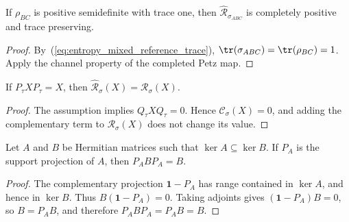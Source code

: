 \begin{theorem}
    \label{thm:entropy_completed_petz_maximally_mixed_cptp}
    \leanok
    If $\rho_{BC}$ is positive semidefinite with trace one, then
    $\widehat{\mathcal R}_{\sigma_{ABC}}$ is completely positive and trace
    preserving.
\end{theorem}

\begin{proof}\leanok
    By~(\ref{eq:entropy_mixed_reference_trace}),
    $\tr(\sigma_{ABC})=\tr(\rho_{BC})=1$. Apply the channel property of the
    completed Petz map.
\end{proof}

\begin{theorem}
    \label{thm:partial_trace_petz_channel_supported_agreement}
    \leanok
    If $P_\tau XP_\tau=X$, then
    $\widehat{\mathcal R}_\sigma(X)=\mathcal R_\sigma(X)$.
\end{theorem}

\begin{proof}\leanok
    The assumption implies $Q_\tau XQ_\tau=0$. Hence
    $\mathcal C_\sigma(X)=0$, and adding the complementary term to
    $\mathcal R_\sigma(X)$ does not change its value.
\end{proof}

\begin{theorem}
    \label{thm:support_projection_absorption_kernel_inclusion}
    \leanok
    Let $A$ and $B$ be Hermitian matrices such that
    $\ker A\subseteq\ker B$. If $P_A$ is the support projection of $A$, then
    $P_A B P_A=B$.
\end{theorem}

\begin{proof}\leanok
    The complementary projection $\mathbf 1-P_A$ has range contained in
    $\ker A$, and hence in $\ker B$. Thus
    $B(\mathbf 1-P_A)=0$. Taking adjoints gives
    $(\mathbf 1-P_A)B=0$, so $B=P_A B$, and therefore
    $P_A B P_A=P_A B=B$.
\end{proof}

